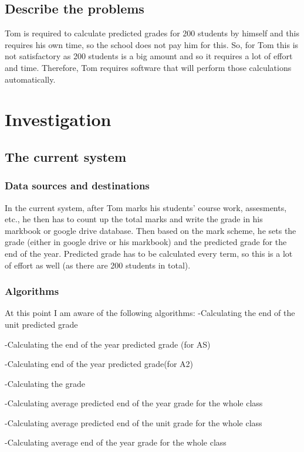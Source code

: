 \subsection{Describe the problems}

Tom is required to calculate predicted grades for 200 students by himself and this requires his own time, so the school does not pay him for this. So, for Tom this is not satisfactory as 200 students is a big amount and so it requires a lot of effort and time. Therefore, Tom requires software that will perform those calculations automatically. 

\section{Investigation}

\subsection{The current system}
\subsubsection{Data sources and destinations}

In the current system, after Tom marks his students' course work, assesments, etc., he then has to count up the total marks and write the grade in his markbook or google drive database. Then based on the mark scheme, he sets the grade (either in google drive or his markbook) and the predicted grade for the end of the year. Predicted grade has to be calculated every term, so this is a lot of effort as well (as there are 200 students in total).

\subsubsection{Algorithms}
At this point I am aware of the following algorithms:
-Calculating the end of the unit predicted grade

-Calculating the end of the year predicted grade (for AS)

-Calculating end of the year predicted grade(for A2)

-Calculating the grade

-Calculating average predicted end of the year grade for the whole class

-Calculating average predicted  end of the unit grade for the whole class

-Calculating average end of the year grade for the whole class



